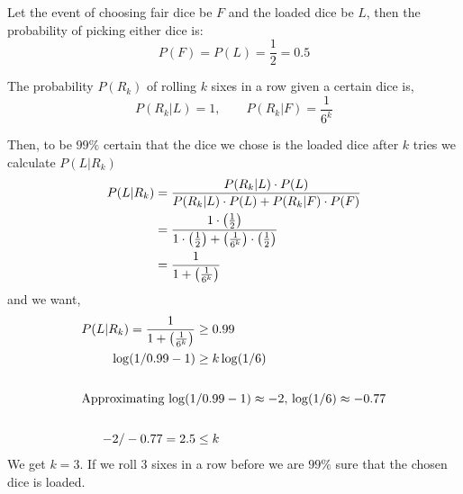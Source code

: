 \documentclass[12pt]{article}
\begin{document}
\begin{solution}
    \bbni

    Let the event of choosing fair dice be $F$ and the loaded dice be $L$, then the probability of picking either dice is: 
    \[P( F) = P( L) = \frac{1}{2} = 0.5\]

    The probability $P(R_k)$ of rolling $k$ sixes in a row given a certain dice is, 
    \[P(R_k |L ) = 1, \qquad P(R_k|F) = \frac{1}{6^k}\]

    Then, to be $99\%$ certain that the dice we chose is the loaded dice after $k$ tries we calculate $P(L|R_k)$
    \begin{align*}
        P(L|R_k) &= \frac{P(R_k|L) \cdot P(L)}{P(R_k|L) \cdot P(L) + P(R_k|F) \cdot P(F)} \\ 
        &= \frac{1 \cdot \left(\frac{1}{2}\right)}{1 \cdot \left(\frac{1}{2}\right) + \left(\frac{1}{6^k}\right) \cdot \left(\frac{1}{2}\right)} \\ 
        &= \frac{1}{1 + \left(\frac{1}{6^k}\right)} \\ 
    \end{align*}
    and we want, 
    \begin{align*}
        P(L|R_k) = \frac{1}{1 + \left(\frac{1}{6^k}\right)} &\geq 0.99  \\ 
        \log(1/0.99 -1) &\geq k \log(1/6)\\ \\
    \intertext{Approximating $\log(1/0.99 -1)  \approx -2, \, \log(1/6) \approx -0.77$} \\ 
        -2/-0.77 =2.5 &\leq k  
    \end{align*}
    We get $k=3$. If we roll $3$ sixes in a row before we are $99\%$ sure that the chosen dice is loaded.
\end{solution}
\end{document}
